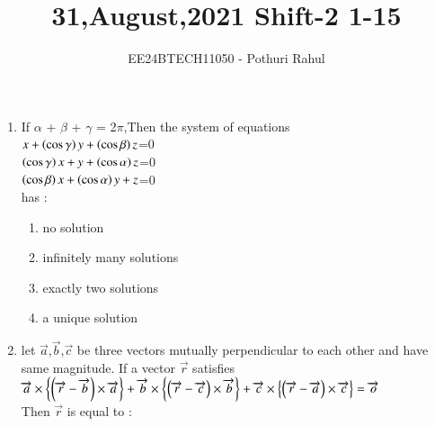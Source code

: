 \documentclass[journal]{IEEEtran}
\begin{document}

\vspace{3cm}
\title{31,August,2021 Shift-2 1-15}
\author{EE24BTECH11050 - Pothuri Rahul}
{\let\newpage\relax\maketitle}
\renewcommand{\thefigure}{\theenumi}
\renewcommand{\thetable}{\theenumi}
\setlength{\intextsep}{10pt} %
\renewcommand{\thetable}{\theenumi}
\begin{enumerate}[start=1]
\item %
If $\alpha$ + $\beta$ + $\gamma$ = 2$\pi$,Then the system of equations \\
$x+\left(\cos{\gamma}\right)y+\left(\cos{\beta}\right)z$=0 \\
$\left(\cos{\gamma}\right)x+y+\left(\cos{\alpha}\right)z$=0 \\
$\left(\cos{\beta}\right)x+\left(\cos{\alpha}\right)y+z$=0 \\
has :
\begin{enumerate}
\item no solution
\item infinitely many solutions
\item exactly two solutions
\item a unique solution
\end{enumerate}
\item %
let $\overrightarrow{a}$,$\overrightarrow{b}$,$\overrightarrow{c}$ be three vectors mutually perpendicular to each other and have same magnitude. If a vector $\overrightarrow{r}$ satisfies \\
$\overrightarrow{a} \times \left\{\left(\overrightarrow{r}-\overrightarrow{b}\right)\times\overrightarrow{a}\right\}+\overrightarrow{b} \times \left\{\left(\overrightarrow{r}-\overrightarrow{c}\right)\times\overrightarrow{b}\right\}+\overrightarrow{c} \times \left\{\left(\overrightarrow{r}-\overrightarrow{a}\right)\times\overrightarrow{c}\right\} = \overrightarrow{o}$ \\
Then $\overrightarrow{r}$ is equal to : \\
\begin{enumerate}
\end{enumerate}
\end{enumerate}
\end{document}
